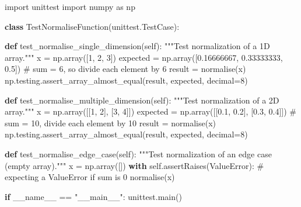 \documentclass[
  letterpaper,
  DIV=11,
  numbers=noendperiod]{scrartcl}
\newenvironment{Shaded}{\begin{snugshade}}{\end{snugshade}}
\newcommand{\CommentTok}[1]{\textcolor[rgb]{0.37,0.37,0.37}{#1}}
\newcommand{\ControlFlowTok}[1]{\textcolor[rgb]{0.00,0.23,0.31}{\textbf{#1}}}
\newcommand{\DecValTok}[1]{\textcolor[rgb]{0.68,0.00,0.00}{#1}}
\newcommand{\FloatTok}[1]{\textcolor[rgb]{0.68,0.00,0.00}{#1}}
\newcommand{\ImportTok}[1]{\textcolor[rgb]{0.00,0.46,0.62}{#1}}
\newcommand{\KeywordTok}[1]{\textcolor[rgb]{0.00,0.23,0.31}{\textbf{#1}}}
\newcommand{\NormalTok}[1]{\textcolor[rgb]{0.00,0.23,0.31}{#1}}
\newcommand{\OperatorTok}[1]{\textcolor[rgb]{0.37,0.37,0.37}{#1}}
\newcommand{\PreprocessorTok}[1]{\textcolor[rgb]{0.68,0.00,0.00}{#1}}
\newcommand{\StringTok}[1]{\textcolor[rgb]{0.13,0.47,0.30}{#1}}
\newcommand{\VariableTok}[1]{\textcolor[rgb]{0.07,0.07,0.07}{#1}}
\begin{document}
\begin{Shaded}
\begin{Highlighting}[]
\ImportTok{import}\NormalTok{ unittest}
\ImportTok{import}\NormalTok{ numpy }\ImportTok{as}\NormalTok{ np}

\KeywordTok{class}\NormalTok{ TestNormaliseFunction(unittest.TestCase):}

    \KeywordTok{def}\NormalTok{ test\_normalise\_single\_dimension(}\VariableTok{self}\NormalTok{):}
        \CommentTok{"""Test normalization of a 1D array."""}
\NormalTok{        x }\OperatorTok{=}\NormalTok{ np.array([}\DecValTok{1}\NormalTok{, }\DecValTok{2}\NormalTok{, }\DecValTok{3}\NormalTok{])}
\NormalTok{        expected }\OperatorTok{=}\NormalTok{ np.array([}\FloatTok{0.16666667}\NormalTok{, }\FloatTok{0.33333333}\NormalTok{, }\FloatTok{0.5}\NormalTok{])  }\CommentTok{\# sum = 6, so divide each element by 6}
\NormalTok{        result }\OperatorTok{=}\NormalTok{ normalise(x)}
\NormalTok{        np.testing.assert\_array\_almost\_equal(result, expected, decimal}\OperatorTok{=}\DecValTok{8}\NormalTok{)}
    
    \KeywordTok{def}\NormalTok{ test\_normalise\_multiple\_dimension(}\VariableTok{self}\NormalTok{):}
        \CommentTok{"""Test normalization of a 2D array."""}
\NormalTok{        x }\OperatorTok{=}\NormalTok{ np.array([[}\DecValTok{1}\NormalTok{, }\DecValTok{2}\NormalTok{], [}\DecValTok{3}\NormalTok{, }\DecValTok{4}\NormalTok{]])}
\NormalTok{        expected }\OperatorTok{=}\NormalTok{ np.array([[}\FloatTok{0.1}\NormalTok{, }\FloatTok{0.2}\NormalTok{], [}\FloatTok{0.3}\NormalTok{, }\FloatTok{0.4}\NormalTok{]])  }\CommentTok{\# sum = 10, divide each element by 10}
\NormalTok{        result }\OperatorTok{=}\NormalTok{ normalise(x)}
\NormalTok{        np.testing.assert\_array\_almost\_equal(result, expected, decimal}\OperatorTok{=}\DecValTok{8}\NormalTok{)}

    \KeywordTok{def}\NormalTok{ test\_normalise\_edge\_case(}\VariableTok{self}\NormalTok{):}
        \CommentTok{"""Test normalization of an edge case (empty array)."""}
\NormalTok{        x }\OperatorTok{=}\NormalTok{ np.array([])}
        \ControlFlowTok{with} \VariableTok{self}\NormalTok{.assertRaises(}\PreprocessorTok{ValueError}\NormalTok{):  }\CommentTok{\# expecting a ValueError if sum is 0}
\NormalTok{            normalise(x)}

\ControlFlowTok{if} \VariableTok{\_\_name\_\_} \OperatorTok{==} \StringTok{"\_\_main\_\_"}\NormalTok{:}
\NormalTok{    unittest.main()}
\end{Highlighting}
\end{Shaded}
\end{document}
